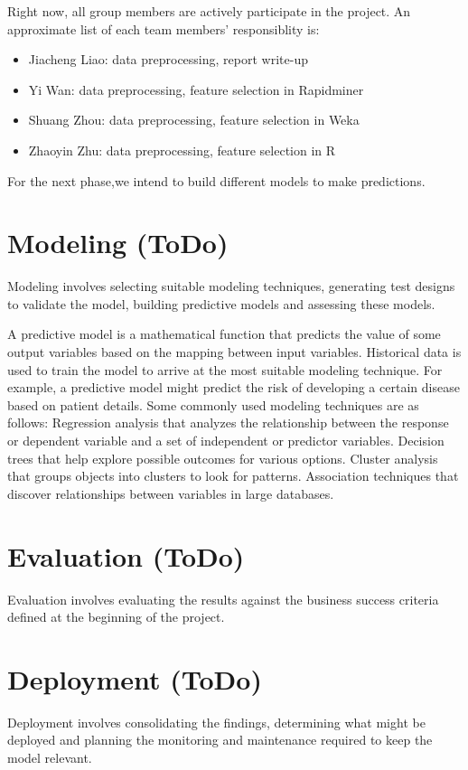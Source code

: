 \documentclass[CEJM,PDF]{cej} %
\begin{document}
Right now, all group members are actively participate in the project. An approximate list of each team members' responsiblity is:
\begin{itemize}
\item Jiacheng Liao: data preprocessing, report write-up
\item Yi Wan: data preprocessing, feature selection in Rapidminer
\item Shuang Zhou: data preprocessing, feature selection in Weka
\item Zhaoyin Zhu: data preprocessing, feature selection in R
\end{itemize}

For the next phase,we intend to build different models to make predictions.



\section{Modeling (ToDo)}

Modeling involves selecting suitable modeling techniques, generating test designs to validate the model, building predictive models and assessing these models.


A predictive model is a mathematical function that predicts the value of some output variables based on the mapping between input variables. Historical data is used to train the model to arrive at the most suitable modeling technique. For example, a predictive model might predict the risk of developing a certain disease based on patient details. Some commonly used modeling techniques are as follows: Regression analysis that analyzes the relationship between the response or dependent variable and a set of independent or predictor variables. Decision trees that help explore possible outcomes for various options. Cluster analysis that groups objects into clusters to look for patterns. Association techniques that discover relationships between variables in large databases.

\section{Evaluation (ToDo)}
Evaluation involves evaluating the results against the business success criteria defined at the beginning of the project.


\section{Deployment (ToDo)}
Deployment involves consolidating the findings, determining what might be deployed and planning the monitoring and maintenance required to keep the model relevant.
\end{document}
